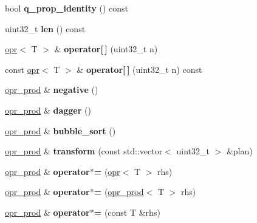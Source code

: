\begin{DoxyCompactItemize}
bool {\bfseries q\+\_\+prop\+\_\+identity} () const
\item 
\mbox{\label{classqbasis_1_1opr__prod_abce902d677512221e8caa1db96ccff7d}} 
uint32\+\_\+t {\bfseries len} () const
\item 
\mbox{\label{classqbasis_1_1opr__prod_a3a01ab535ac488d3deb8374a7fbb30de}} 
\hyperlink{classqbasis_1_1opr}{opr}$<$ T $>$ \& {\bfseries operator\mbox{[}$\,$\mbox{]}} (uint32\+\_\+t n)
\item 
\mbox{\label{classqbasis_1_1opr__prod_aab60e0b982f84e98bb0083c33d190a3c}} 
const \hyperlink{classqbasis_1_1opr}{opr}$<$ T $>$ \& {\bfseries operator\mbox{[}$\,$\mbox{]}} (uint32\+\_\+t n) const
\item 
\mbox{\label{classqbasis_1_1opr__prod_a3969edcb933a7f68103f8e8e707322d3}} 
\hyperlink{classqbasis_1_1opr__prod}{opr\+\_\+prod} \& {\bfseries negative} ()
\item 
\mbox{\label{classqbasis_1_1opr__prod_a48093aa9f747bacd9f050b943e40e77d}} 
\hyperlink{classqbasis_1_1opr__prod}{opr\+\_\+prod} \& {\bfseries dagger} ()
\item 
\mbox{\label{classqbasis_1_1opr__prod_ac8671f3eaef84e2342b584cee68bbd8f}} 
\hyperlink{classqbasis_1_1opr__prod}{opr\+\_\+prod} \& {\bfseries bubble\+\_\+sort} ()
\item 
\mbox{\label{classqbasis_1_1opr__prod_a82bb2f82f8ef3fc32b06dd23a052da5c}} 
\hyperlink{classqbasis_1_1opr__prod}{opr\+\_\+prod} \& {\bfseries transform} (const std\+::vector$<$ uint32\+\_\+t $>$ \&plan)
\item 
\mbox{\label{classqbasis_1_1opr__prod_aa04c423a6bd659e07318fff2e1414731}} 
\hyperlink{classqbasis_1_1opr__prod}{opr\+\_\+prod} \& {\bfseries operator$\ast$=} (\hyperlink{classqbasis_1_1opr}{opr}$<$ T $>$ rhs)
\item 
\mbox{\label{classqbasis_1_1opr__prod_a0556be7a5f5f17ccf7c98c745daae53b}} 
\hyperlink{classqbasis_1_1opr__prod}{opr\+\_\+prod} \& {\bfseries operator$\ast$=} (\hyperlink{classqbasis_1_1opr__prod}{opr\+\_\+prod}$<$ T $>$ rhs)
\item 
\mbox{\label{classqbasis_1_1opr__prod_a564df304a1d99f844919f2a46f200925}} 
\hyperlink{classqbasis_1_1opr__prod}{opr\+\_\+prod} \& {\bfseries operator$\ast$=} (const T \&rhs)
\end{DoxyCompactItemize}
